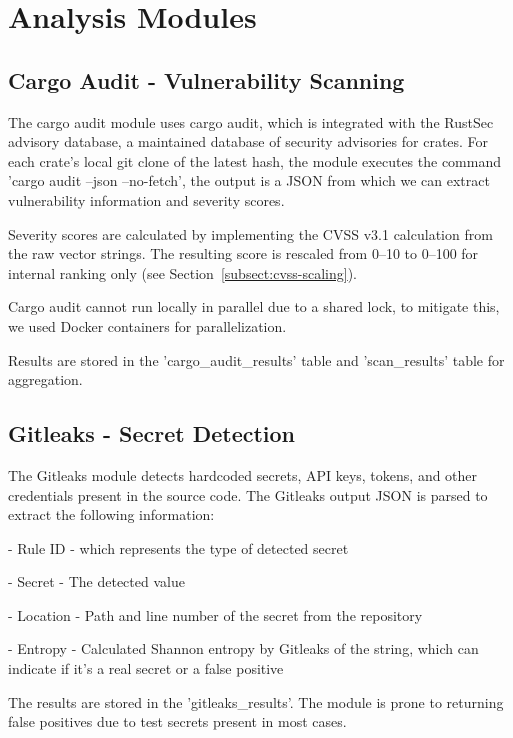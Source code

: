 \chapter{Analysis Modules}\label{chapter:chap5}

\section{Cargo Audit - Vulnerability Scanning}\label{sect:cargo-audit}

The cargo audit module uses cargo audit, which is integrated with the RustSec advisory database, a maintained database of security advisories for crates. For each crate's local git clone of the latest hash, the module executes the command 'cargo audit --json --no-fetch', the output is a JSON from which we can extract vulnerability information and severity scores.

Severity scores are calculated by implementing the CVSS v3.1 calculation from the raw vector strings. The resulting score is rescaled from 0--10 to 0--100 for internal ranking only (see Section~\ref{subsect:cvss-scaling}).

Cargo audit cannot run locally in parallel due to a shared lock, to mitigate this, we used Docker containers for parallelization.

Results are stored in the 'cargo\_audit\_results' table and 'scan\_results' table for aggregation.

\section{Gitleaks - Secret Detection}\label{sect:gitleaks-module}

The Gitleaks module detects hardcoded secrets, API keys, tokens, and other credentials present in the source code. The Gitleaks output JSON is parsed to extract the following information:

- Rule ID - which represents the type of detected secret

- Secret - The detected value

- Location - Path and line number of the secret from the repository

- Entropy - Calculated Shannon entropy by Gitleaks of the string, which can indicate if it's a real secret or a false positive

The results are stored in the 'gitleaks\_results'.
The module is prone to returning false positives due to test secrets present in most cases.

